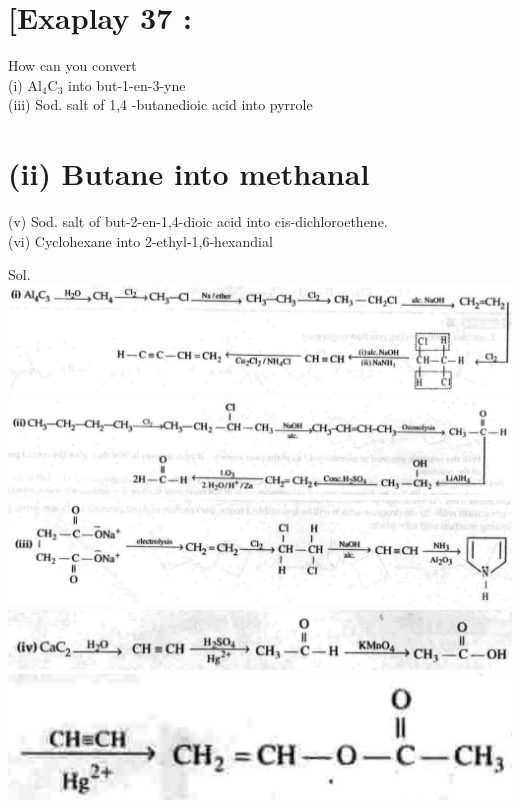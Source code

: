 \documentclass[10pt]{article}
\begin{document}
\section*{[Exaplay 37 :}
How can you convert\\
(i) $\mathrm{Al}_{4} \mathrm{C}_{3}$ into but-1-en-3-yne\\
(iii) Sod. salt of 1,4 -butanedioic acid into pyrrole

\section*{(ii) Butane into methanal}
(v) Sod. salt of but-2-en-1,4-dioic acid into cis-dichloroethene.\\
(vi) Cyclohexane into 2-ethyl-1,6-hexandial

Sol.\\
\includegraphics[max width=\textwidth, center]{2025_01_28_8470952b98110cec3aabg-228(2)}\\
\includegraphics[max width=\textwidth, center]{2025_01_28_8470952b98110cec3aabg-228(3)}\\
\includegraphics[max width=\textwidth, center]{2025_01_28_8470952b98110cec3aabg-228(1)}\\
\includegraphics[max width=\textwidth, center]{2025_01_28_8470952b98110cec3aabg-229(1)}\\
\includegraphics[max width=\textwidth, center]{2025_01_28_8470952b98110cec3aabg-229}\\
\end{document}
